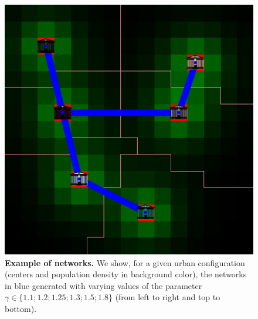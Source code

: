 \documentclass[runningheads,a4paper]{llncs}
\begin{document}
\begin{figure}[h!]
	\includegraphics[width=0.32\linewidth]{bionw_territ6_gamma1_8.png}
	\caption{\textbf{Example of networks.} We show, for a given urban configuration (centers and population density in background color), the networks in blue generated with varying values of the parameter $\gamma \in \{1.1 ; 1.2 ; 1.25 ; 1.3 ; 1.5 ; 1.8 \}$ (from left to right and top to bottom).\label{fig:exnw}}
\end{figure}






\end{document}
